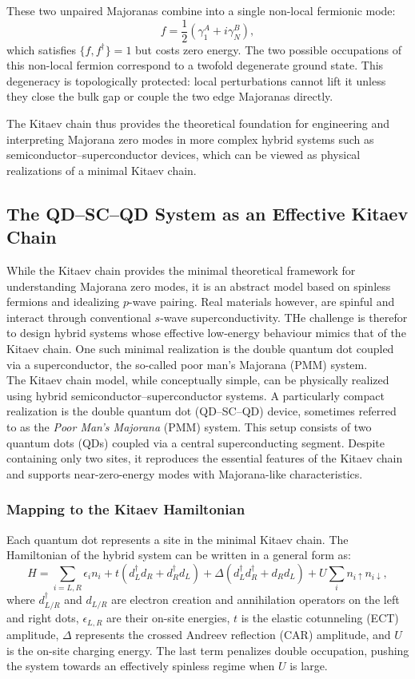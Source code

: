 \documentclass[11pt, letterpaper, titlepage]{article}
\begin{document}
These two unpaired Majoranas combine into a single non-local fermionic mode:
\begin{equation}
f = \frac{1}{2}(\gamma_1^A + i\gamma_N^B),
\end{equation}
which satisfies $\{f, f^\dagger\}=1$ but costs zero energy. The two possible occupations of this non-local fermion correspond to a twofold degenerate ground state. This degeneracy is topologically protected: local perturbations cannot lift it unless they close the bulk gap or couple the two edge Majoranas directly.

The Kitaev chain thus provides the theoretical foundation for engineering and interpreting Majorana zero modes in more complex hybrid systems such as semiconductor–superconductor devices, which can be viewed as physical realizations of a minimal Kitaev chain.
\subsection{The QD–SC–QD System as an Effective Kitaev Chain}
While the Kitaev chain provides the minimal theoretical framework for understanding Majorana zero modes, it is an abstract model based on spinless fermions and idealizing $p$-wave pairing. Real materials however, are spinful and interact through conventional $s$-wave superconductivity. THe challenge is therefor to design hybrid systems whose effective low-energy behaviour mimics that of the Kitaev chain. One such minimal realization is the double quantum dot coupled via a superconductor, the so-called poor man's Majorana (PMM) system.\\
The Kitaev chain model, while conceptually simple, can be physically realized using hybrid semiconductor–superconductor systems. A particularly compact realization is the double quantum dot (QD–SC–QD) device, sometimes referred to as the \textit{Poor Man’s Majorana} (PMM) system. This setup consists of two quantum dots (QDs) coupled via a central superconducting segment. Despite containing only two sites, it reproduces the essential features of the Kitaev chain and supports near-zero-energy modes with Majorana-like characteristics.

\subsubsection{Mapping to the Kitaev Hamiltonian}

Each quantum dot represents a site in the minimal Kitaev chain. The Hamiltonian of the hybrid system can be written in a general form as:
\begin{equation}
H = \sum_{i=L,R} \epsilon_i n_i
+ t (d_L^\dagger d_R + d_R^\dagger d_L)
+ \Delta (d_L^\dagger d_R^\dagger + d_R d_L)
+ U \sum_i n_{i\uparrow} n_{i\downarrow},
\label{eq:qdsqdh}
\end{equation}
where $d_{L/R}^\dagger$ and $d_{L/R}$ are electron creation and annihilation operators on the left and right dots, $\epsilon_{L,R}$ are their on-site energies, $t$ is the elastic cotunneling (ECT) amplitude, $\Delta$ represents the crossed Andreev reflection (CAR) amplitude, and $U$ is the on-site charging energy. The last term penalizes double occupation, pushing the system towards an effectively spinless regime when $U$ is large.
\end{document}
